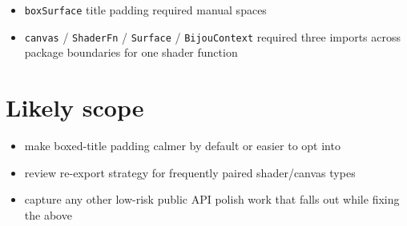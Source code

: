 \begin{itemize}
\tightlist
\item
  \texttt{b\allowbreak{}o\allowbreak{}x\allowbreak{}S\allowbreak{}u\allowbreak{}r\allowbreak{}f\allowbreak{}a\allowbreak{}c\allowbreak{}e} title padding required manual spaces
\item
  \texttt{c\allowbreak{}a\allowbreak{}n\allowbreak{}v\allowbreak{}a\allowbreak{}s} / \texttt{S\allowbreak{}h\allowbreak{}a\allowbreak{}d\allowbreak{}e\allowbreak{}r\allowbreak{}F\allowbreak{}n} / \texttt{S\allowbreak{}u\allowbreak{}r\allowbreak{}f\allowbreak{}a\allowbreak{}c\allowbreak{}e} / \texttt{B\allowbreak{}i\allowbreak{}j\allowbreak{}o\allowbreak{}u\allowbreak{}C\allowbreak{}o\allowbreak{}n\allowbreak{}t\allowbreak{}e\allowbreak{}x\allowbreak{}t} required three imports across package boundaries for one shader function
\end{itemize}

\section{Likely scope}\label{record-304-likely-scope}

\begin{itemize}
\tightlist
\item
  make boxed-title padding calmer by default or easier to opt into
\item
  review re-export strategy for frequently paired shader/canvas types
\item
  capture any other low-risk public API polish work that falls out while fixing the above
\end{itemize}

